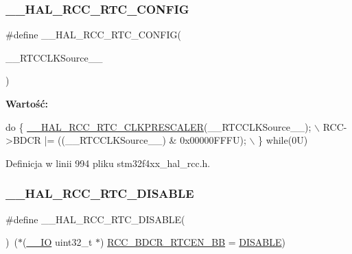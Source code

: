 \subsubsection{\texorpdfstring{\+\_\+\+\_\+\+H\+A\+L\+\_\+\+R\+C\+C\+\_\+\+R\+T\+C\+\_\+\+C\+O\+N\+F\+IG}{\_\_HAL\_RCC\_RTC\_CONFIG}}
{\footnotesize\ttfamily \#define \+\_\+\+\_\+\+H\+A\+L\+\_\+\+R\+C\+C\+\_\+\+R\+T\+C\+\_\+\+C\+O\+N\+F\+IG(\begin{DoxyParamCaption}\item[{}]{\+\_\+\+\_\+\+R\+T\+C\+C\+L\+K\+Source\+\_\+\+\_\+ }\end{DoxyParamCaption})}

{\bfseries Wartość\+:}
\begin{DoxyCode}
\textcolor{keywordflow}{do} \{ \hyperlink{group___r_c_c___internal___r_t_c___clock___configuration_ga7e10e306e7d9f3cd59d30dcb2c9cf61d}{\_\_HAL\_RCC\_RTC\_CLKPRESCALER}(\_\_RTCCLKSource\_\_);    \(\backslash\)
                                                    RCC->BDCR |= ((\_\_RTCCLKSource\_\_) & 0x00000FFFU);  \(\backslash\)
                                                   \} \textcolor{keywordflow}{while}(0U)
\end{DoxyCode}


Definicja w linii 994 pliku stm32f4xx\+\_\+hal\+\_\+rcc.\+h.

\mbox{\label{group___r_c_c___internal___r_t_c___clock___configuration_gaab5eeb81fc9f0c8d4450069f7a751855}} 
\subsubsection{\texorpdfstring{\+\_\+\+\_\+\+H\+A\+L\+\_\+\+R\+C\+C\+\_\+\+R\+T\+C\+\_\+\+D\+I\+S\+A\+B\+LE}{\_\_HAL\_RCC\_RTC\_DISABLE}}
{\footnotesize\ttfamily \#define \+\_\+\+\_\+\+H\+A\+L\+\_\+\+R\+C\+C\+\_\+\+R\+T\+C\+\_\+\+D\+I\+S\+A\+B\+LE(\begin{DoxyParamCaption}{ }\end{DoxyParamCaption})~($\ast$(\hyperlink{core__sc300_8h_aec43007d9998a0a0e01faede4133d6be}{\+\_\+\+\_\+\+IO} uint32\+\_\+t $\ast$) \hyperlink{group___r_c_c___bit_address___alias_region_ga583ba8653153b48a06473d0a331f781d}{R\+C\+C\+\_\+\+B\+D\+C\+R\+\_\+\+R\+T\+C\+E\+N\+\_\+\+BB} = \hyperlink{group___exported__types_ggac9a7e9a35d2513ec15c3b537aaa4fba1ad3a9df141be0ccf10389b640f492b26d}{D\+I\+S\+A\+B\+LE})}



